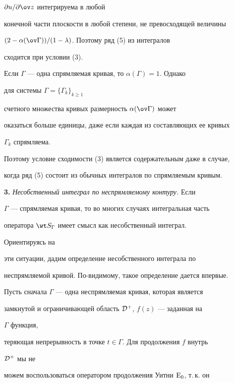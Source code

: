 $\partial u/\partial\ov z$ интегрируема в любой


конечной части плоскости в любой степени, не превосходящей величины


$(2-\alpha(\ov\Gamma))/(1-\lambda)$. Поэтому ряд (5) из интегралов


сходится при условии (3).





\begin{note}


Если $\Gamma$ --- одна спрямляемая кривая, то $\alpha(\Gamma)=1$. Однако


для системы $\Gamma=\{\Gamma_k\}_{k\ge 1}$


счетного множества кривых размерность $\alpha(\ov\Gamma)$ может


оказаться больше единицы, даже если каждая из составляющих ее кривых


$\Gamma_k$ спрямляема.


Поэтому условие сходимости (3) является содержательным даже в случае,


когда ряд (5) состоит из обычных интегралов по спрямляемым кривым.


\end{note}





{\bf 3.} {\it Несобственный интеграл по неспрямляемому контуру.} Если


$\Gamma$ --- спрямляемая кривая, то во многих случаях интегральная часть


оператора $\wt S_\Gamma$ имеет смысл как несобственный интеграл.


Ориентируясь на


эти ситуации, дадим определение несобственного интеграла по


неспрямляемой кривой. По-видимому, такое определение дается впервые.





Пусть сначала $\Gamma$ --- одна неспрямляемая кривая, которая является


замкнутой и ограничивающей область $\cal D^+$, $f(z)$ --- заданная на


$\Gamma$ функция,


теряющая непрерывность в точке $t\in\Gamma$. Для продолжения $f$ внутрь


$\cal D^+$ мы не


можем воспользоваться оператором продолжения Уитни $\mathrm{E}_0$, т.\,к. он


